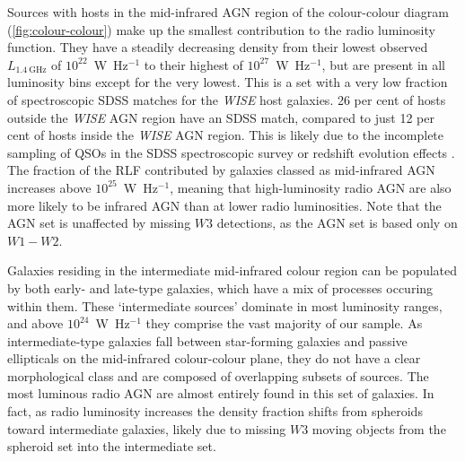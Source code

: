 \documentclass[11pt, a4paper]{book}
\begin{document}
      Sources with hosts in the mid-infrared AGN region of the colour-colour diagram (\autoref{fig:colour-colour}) make
      up the smallest contribution to the radio luminosity function. They have
      a steadily decreasing density from their lowest observed $L_{1.4\ \mathrm{GHz}}$ of $10^{22}$~W~Hz$^{-1}$ to their highest of
      $10^{27}$~W~Hz$^{-1}$, but are present in all luminosity bins except for
      the very lowest. This is a set with a very low fraction of spectroscopic SDSS matches for the \emph{WISE} host galaxies. 26 per cent of
      hosts outside the \emph{WISE} AGN region have an SDSS match, compared to just 12 per
      cent of hosts inside the \emph{WISE} AGN region. This is likely due to the incomplete sampling of QSOs in the SDSS spectroscopic survey or redshift evolution effects \citep{strauss02sdss}. The fraction of the RLF contributed by galaxies classed as mid-infrared AGN increases above $10^{25}$~W~Hz$^{-1}$, meaning that high-luminosity radio AGN are also more likely to be infrared AGN than at lower radio luminosities. Note that the AGN set is unaffected by missing $W3$ detections, as the AGN set is based only on $W1-W2$.

      Galaxies residing in the intermediate mid-infrared colour region can be
      populated by both early- and late-type galaxies, which have a mix of
      processes occuring within them. These `intermediate sources' dominate in
      most luminosity ranges, and above $10^{24}$~W~Hz$^{-1}$ they comprise the
      vast majority of our sample. As intermediate-type galaxies fall between
      star-forming galaxies and passive ellipticals on the mid-infrared colour-colour plane, they do
      not have a clear morphological class and are composed of overlapping subsets of sources. The most luminous radio AGN are almost entirely found in
      this set of galaxies. In fact, as radio luminosity increases the density
      fraction shifts from spheroids toward intermediate galaxies, likely due to missing $W3$ moving objects from the spheroid set into the intermediate set.
\end{document}
